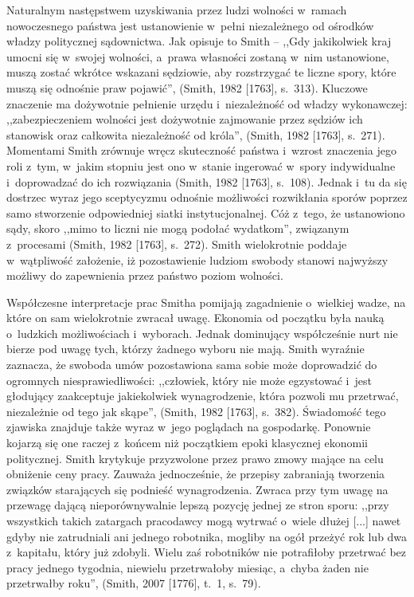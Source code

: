 Naturalnym następstwem uzyskiwania przez ludzi wolności w~ramach nowoczesnego państwa jest ustanowienie w~pełni niezależnego od ośrodków władzy politycznej sądownictwa. Jak opisuje to Smith -- ,,Gdy jakikolwiek kraj umocni się w~swojej wolności, a~prawa własności zostaną w~nim ustanowione, muszą zostać wkrótce wskazani sędziowie, aby rozstrzygać te liczne spory, które muszą się odnośnie praw pojawić'', \label{ref:RNDkH7t6CSI0T}(Smith, 1982 [1763], s.~313). Kluczowe znaczenie ma dożywotnie pełnienie urzędu i~niezależność od władzy wykonawczej: ,,zabezpieczeniem wolności jest dożywotnie zajmowanie przez sędziów ich stanowisk oraz całkowita niezależność od króla'', \label{ref:RNDQY5dE7difr}(Smith, 1982 [1763], s.~271). Momentami Smith zrównuje wręcz skuteczność państwa i~wzrost znaczenia jego roli z~tym, w~jakim stopniu jest ono w~stanie ingerować w~spory indywidualne i~doprowadzać do ich rozwiązania \label{ref:RNDK9nA5CA9CU}(Smith, 1982 [1763], s.~108). Jednak i~tu da się dostrzec wyraz jego sceptycyzmu odnośnie możliwości rozwikłania sporów poprzez samo stworzenie odpowiedniej siatki instytucjonalnej. Cóż z~tego, że ustanowiono sądy, skoro ,,mimo to liczni nie mogą podołać wydatkom'', związanym z~procesami \label{ref:RNDfgTZLS43gg}(Smith, 1982 [1763], s.~272). Smith wielokrotnie poddaje w~wątpliwość założenie, iż pozostawienie ludziom swobody stanowi najwyższy możliwy do zapewnienia przez państwo poziom wolności.

Współczesne interpretacje prac Smitha pomijają zagadnienie o~wielkiej wadze, na które on sam wielokrotnie zwracał uwagę. Ekonomia od początku była nauką o~ludzkich możliwościach i~wyborach. Jednak dominujący współcześnie nurt nie bierze pod uwagę tych, którzy żadnego wyboru nie mają. Smith wyraźnie zaznacza, że swoboda umów pozostawiona sama sobie może doprowadzić do ogromnych niesprawiedliwości: ,,człowiek, który nie może egzystować i~jest głodujący zaakceptuje jakiekolwiek wynagrodzenie, która pozwoli mu przetrwać, niezależnie od tego jak skąpe'', \label{ref:RNDIiGLDa4lxS}(Smith, 1982 [1763], s.~382). Świadomość tego zjawiska znajduje także wyraz w~jego poglądach na gospodarkę. Ponownie kojarzą się one raczej z~końcem niż początkiem epoki klasycznej ekonomii politycznej. Smith krytykuje przyzwolone przez prawo zmowy mające na celu obniżenie ceny pracy. Zauważa jednocześnie, że przepisy zabraniają tworzenia związków starających się podnieść wynagrodzenia. Zwraca przy tym uwagę na przewagę dającą nieporównywalnie lepszą pozycję jednej ze stron sporu: ,,przy wszystkich takich zatargach pracodawcy mogą wytrwać o~wiele dłużej [...] nawet gdyby nie zatrudniali ani jednego robotnika, mogliby na ogół przeżyć rok lub dwa z~kapitału, który już zdobyli. Wielu zaś robotników nie potrafiłoby przetrwać bez pracy jednego tygodnia, niewielu przetrwałoby miesiąc, a~chyba żaden nie przetrwałby roku'', \label{ref:RND1j5HGSGWhu}(Smith, 2007 [1776], t.~1, s.~79).

